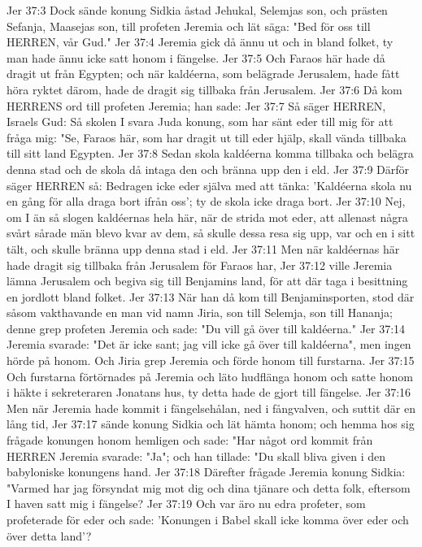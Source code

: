 Jer 37:3  Dock sände konung Sidkia åstad Jehukal, Selemjas son, och prästen Sefanja, Maasejas son, till profeten Jeremia och lät säga: "Bed för oss till HERREN, vår Gud."
Jer 37:4  Jeremia gick då ännu ut och in bland folket, ty man hade ännu icke satt honom i fängelse.
Jer 37:5  Och Faraos här hade då dragit ut från Egypten; och när kaldéerna, som belägrade Jerusalem, hade fått höra ryktet därom, hade de dragit sig tillbaka från Jerusalem.
Jer 37:6  Då kom HERRENS ord till profeten Jeremia; han sade:
Jer 37:7  Så säger HERREN, Israels Gud: Så skolen I svara Juda konung, som har sänt eder till mig för att fråga mig: "Se, Faraos här, som har dragit ut till eder hjälp, skall vända tillbaka till sitt land Egypten.
Jer 37:8  Sedan skola kaldéerna komma tillbaka och belägra denna stad och de skola då intaga den och bränna upp den i eld.
Jer 37:9  Därför säger HERREN så: Bedragen icke eder själva med att tänka: 'Kaldéerna skola nu en gång för alla draga bort ifrån oss'; ty de skola icke draga bort.
Jer 37:10  Nej, om I än så slogen kaldéernas hela här, när de strida mot eder, att allenast några svårt sårade män blevo kvar av dem, så skulle dessa resa sig upp, var och en i sitt tält, och skulle bränna upp denna stad i eld.
Jer 37:11  Men när kaldéernas här hade dragit sig tillbaka från Jerusalem för Faraos har,
Jer 37:12  ville Jeremia lämna Jerusalem och begiva sig till Benjamins land, för att där taga i besittning en jordlott bland folket.
Jer 37:13  När han då kom till Benjaminsporten, stod där såsom vakthavande en man vid namn Jiria, son till Selemja, son till Hananja; denne grep profeten Jeremia och sade: "Du vill gå över till kaldéerna."
Jer 37:14  Jeremia svarade: "Det är icke sant; jag vill icke gå över till kaldéerna", men ingen hörde på honom. Och Jiria grep Jeremia och förde honom till furstarna.
Jer 37:15  Och furstarna förtörnades på Jeremia och läto hudflänga honom och satte honom i häkte i sekreteraren Jonatans hus, ty detta hade de gjort till fängelse.
Jer 37:16  Men när Jeremia hade kommit i fängelsehålan, ned i fångvalven, och suttit där en lång tid,
Jer 37:17  sände konung Sidkia och lät hämta honom; och hemma hos sig frågade konungen honom hemligen och sade: "Har något ord kommit från HERREN Jeremia svarade: "Ja"; och han tillade: "Du skall bliva given i den babyloniske konungens hand.
Jer 37:18  Därefter frågade Jeremia konung Sidkia: "Varmed har jag försyndat mig mot dig och dina tjänare och detta folk, eftersom I haven satt mig i fängelse?
Jer 37:19  Och var äro nu edra profeter, som profeterade för eder och sade: 'Konungen i Babel skall icke komma över eder och över detta land'?

